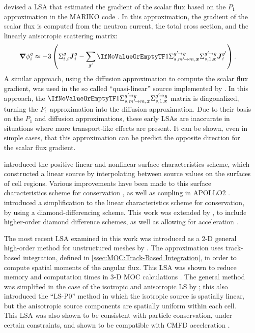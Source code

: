 {{{            \citeauthor{Petkov1998} devised a \ac{LSA} that estimated the gradient of the scalar flux based on the $P_1$ approximation in the MARIKO code \cite{Petkov1998,Petkov1999}.
            In this approximation, the gradient of the scalar flux is computed from the neutron current, the total cross section, and the linearly anisotropic scattering matrix:
            \begin{equation}\label{eq:MOC:LSA:Current2Gradient}
                \grad\sflux \approx -3\left(\xst\current - \suml[\gprime]\xss[1]\current[i][\gprime]\right).
            \end{equation}
            A similar approach, using the diffusion approximation to compute the scalar flux gradient, was used in the so called ``quasi-linear'' source implemented by \citet{Rabiti2009}.
            In this approach, the $\xss[1]$ matrix is diagonalized, turning the $P_1$ approximation into the diffusion approximation.
            Due to their basis on the $P_1$ and diffusion approximations, these early \acp{LSA} are inaccurate in situations where more transport-like effects are present.
            It can be shown, even in simple cases, that this approximation can be predict the opposite direction for the scalar flux gradient.

            \citet{Santandrea2002} introduced the positive linear and nonlinear surface characteristics scheme, which constructed a linear source by interpolating between source values on the surfaces of cell regions.
            Various improvements have been made to this surface characteristics scheme for conservation \cite{Santandrea2002}, as well as coupling in APOLLO2 \cite{Santandrea2008}.
            \citet{LeTellier2006} introduced a simplification to the linear characteristics scheme for conservation, by using a diamond-differencing scheme.
            This work was extended by \citet{Hebert2016}, to include higher-order diamond difference schemes, as well as allowing for acceleration \cite{Hebert2017}.

            The most recent \ac{LSA} examined in this work was introduced as a 2-D general high-order method for unstructured meshes by \citet{Masiello2009}.
            The approximation uses track-based integration, defined in \cref{ssec:MOC:Track-Based Integration}, in order to compute spatial moments of the angular flux.
            This \ac{LSA} was shown to reduce memory and computation times in 3-D \ac{MOC} calculations \cite{Chai2009}.
            The general method was simplified in the case of the isotropic and anisotropic \ac{LS} by \citet{Ferrer2016}; this also introduced the ``LS-P0'' method in which the isotropic source is spatially linear, but the anisotropic source components are spatially uniform within each cell.
            This \ac{LSA} was also shown to be consistent with particle conservation, under certain constraints, and shown to be compatible with \ac{CMFD} acceleration \cite{Ferrer2018}.

}}}
